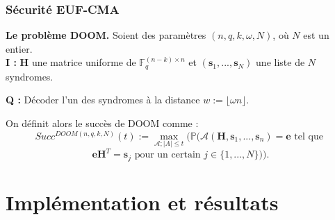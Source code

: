 \documentclass[10pt,a4paper]{beamer}
\theoremstyle{plain}
\theoremstyle{definition}
\newcommand{\F}{\mathbb{F}}
\begin{document}
\begin{frame}
\frametitle{Sécurité EUF-CMA}
\textbf{Le problème DOOM.} Soient des paramètres $(n,q,k,\omega,N)$, où $N$ est un entier. \\

\leftskip=1cm
\noindent \textbf{I :} $\mathbf{H}$ une matrice uniforme de $\F_q^{(n-k)\times n}$ et $(\mathbf{s}_1,...,\mathbf{s}_N)$ une liste de $N$ syndromes. 

\noindent \textbf{Q :} Décoder l'un des syndromes à la distance $w := \lfloor \omega n \rfloor$. \\

\leftskip=0cm

\noindent On définit alors le succès de DOOM comme :
$$Succ^{DOOM(n,q,k,N)}(t) := \max_{\mathcal{A};|A|\leq t}(\mathbb{P}(\mathcal{A}(\mathbf{H},\mathbf{s}_1,...,\mathbf{s}_n)=\mathbf{e}\text{ tel que }$$
$$ \mathbf{eH}^T = \mathbf{s}_j \text{ pour un certain } j \in \{1,...,N\})).$$

\end{frame}



\section{Implémentation et résultats}
\end{document}
